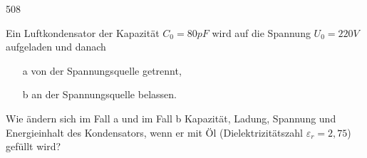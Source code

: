 \begin{auf}
    508
\end{auf}
Ein Luftkondensator der Kapazität $C_0=80pF$ wird auf die Spannung $U_0=220V$ aufgeladen und danach
\begin{enumerate}
    \item[a] von der Spannungsquelle getrennt, 
    \item[b] an der Spannungsquelle belassen.	
\end{enumerate}
Wie ändern sich im Fall a und im Fall b Kapazität, Ladung, Spannung und Energieinhalt des Kondensators, wenn er mit Öl (Dielektrizitätszahl $\varepsilon_r=2,75$) gefüllt wird?